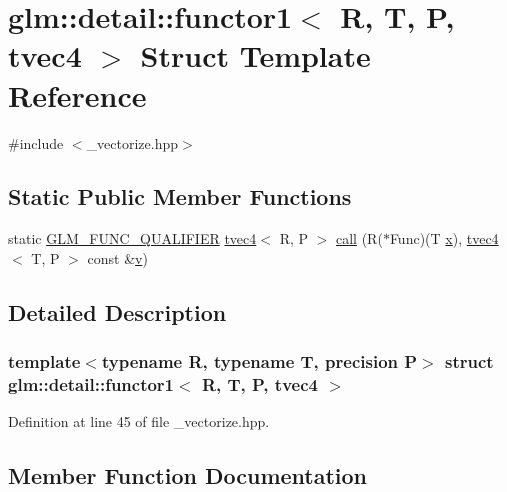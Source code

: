 \hypertarget{structglm_1_1detail_1_1functor1_3_01_r_00_01_t_00_01_p_00_01tvec4_01_4}{}\section{glm\+::detail\+::functor1$<$ R, T, P, tvec4 $>$ Struct Template Reference}
\label{structglm_1_1detail_1_1functor1_3_01_r_00_01_t_00_01_p_00_01tvec4_01_4}


{\ttfamily \#include $<$\+\_\+vectorize.\+hpp$>$}

\subsection*{Static Public Member Functions}
\begin{DoxyCompactItemize}
\item 
static \mbox{\hyperlink{setup_8hpp_a33fdea6f91c5f834105f7415e2a64407}{G\+L\+M\+\_\+\+F\+U\+N\+C\+\_\+\+Q\+U\+A\+L\+I\+F\+I\+ER}} \mbox{\hyperlink{structglm_1_1tvec4}{tvec4}}$<$ R, P $>$ \mbox{\hyperlink{structglm_1_1detail_1_1functor1_3_01_r_00_01_t_00_01_p_00_01tvec4_01_4_a65634749e4ae6e35d4cc898481d4681f}{call}} (R($\ast$Func)(T \mbox{\hyperlink{glad_8h_a92d0386e5c19fb81ea88c9f99644ab1d}{x}}), \mbox{\hyperlink{structglm_1_1tvec4}{tvec4}}$<$ T, P $>$ const \&\mbox{\hyperlink{glad_8h_a14cfbe2fc2234f5504618905b69d1e06}{v}})
\end{DoxyCompactItemize}


\subsection{Detailed Description}
\subsubsection*{template$<$typename R, typename T, precision P$>$\newline
struct glm\+::detail\+::functor1$<$ R, T, P, tvec4 $>$}



Definition at line 45 of file \+\_\+vectorize.\+hpp.



\subsection{Member Function Documentation}
\mbox{\label{structglm_1_1detail_1_1functor1_3_01_r_00_01_t_00_01_p_00_01tvec4_01_4_a65634749e4ae6e35d4cc898481d4681f}} 
